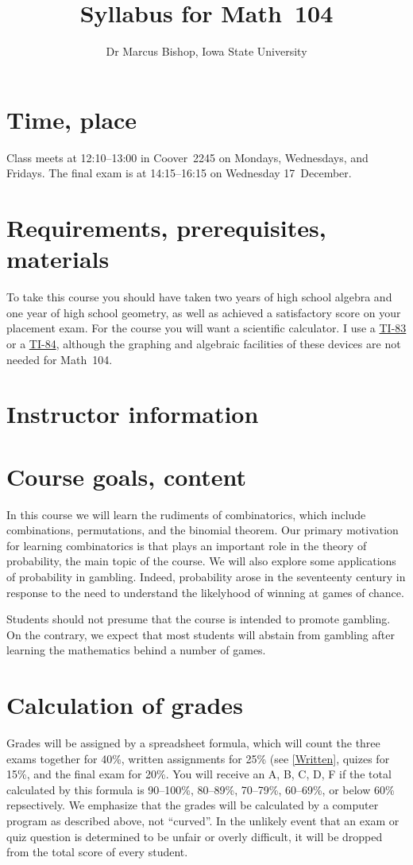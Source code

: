 \documentclass[11pt]{article}
\title{Syllabus for Math~104}
\author{Dr Marcus Bishop, Iowa State University}
\begin{document}
\maketitle

\section{Time, place}\label{Time} Class meets at 12:10--13:00
in Coover~2245 on Mondays, Wednesdays, and Fridays.
The final exam is at 14:15--16:15 on Wednesday 17~December.

\section{Requirements, prerequisites, materials}\label{Require}
To take this course you should have taken two
years of high school algebra and one year of high school geometry,
as well as achieved a satisfactory score on your placement exam.
For the course you will want a scientific calculator.
I use a \href{http://en.wikipedia.org/wiki/TI-83}{TI-83} or a
\href{http://en.wikipedia.org/wiki/TI-84}{TI-84}, although
the graphing and algebraic facilities of these devices are
not needed for Math~104.

\section{Instructor information}
\section{Course goals, content}
In this course we will learn the rudiments of combinatorics,
which include combinations, permutations, and the binomial theorem.
Our primary motivation for learning combinatorics is that
plays an important role in the theory of probability, the main
topic of the course. We will also explore some
applications of probability in gambling. Indeed, probability
arose in the seventeenty century in response to the need
to understand the likelyhood of winning at games of chance.

Students should not presume that the course is intended to
promote gambling. On the contrary, we expect that most
students will abstain from gambling after learning the mathematics
behind a number of games.

\section{Calculation of grades}\label{Assessment}
Grades will be assigned by a spreadsheet formula, which will count
the three exams together for 40\%, written assignments for 25\% (see \autoref{Written},
quizes for 15\%, and the final exam for 20\%. You will receive an A, B, C, D, F
if the total calculated by this formula is
90--100\%, 80--89\%, 70--79\%, 60--69\%, or below 60\% repsectively.
We emphasize that the grades will be calculated by a computer program as described
above, not ``curved''. In the unlikely event that an exam or quiz question is determined
to be unfair or overly difficult, it will be dropped from the total score of
every student.
\end{document}
